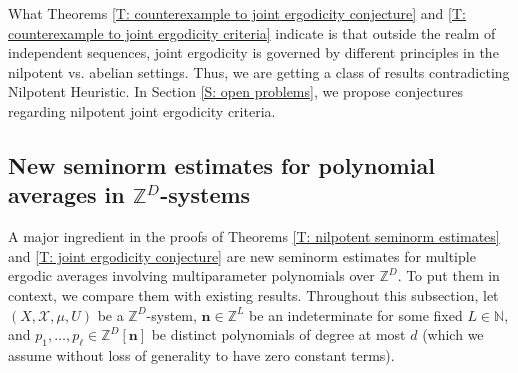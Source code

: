 \documentclass[11pt]{amsart}
\theoremstyle{definition}
\newcommand{\N}{{\mathbb N}}
\newcommand{\Z}{{\mathbb Z}}
\newcommand{\CX}{{\mathcal X}}
\newcommand{\bn}{{\mathbf{n}}}
\newcommand{\1}{{\mathbf{1}}}
\begin{document}
What Theorems \ref{T: counterexample to joint ergodicity conjecture} and \ref{T: counterexample to joint ergodicity criteria} indicate is that outside the realm of independent sequences, joint ergodicity is governed by different principles in the nilpotent vs. abelian settings. Thus, we are getting a class of results contradicting Nilpotent Heuristic. In Section \ref{S: open problems}, we propose conjectures regarding nilpotent joint ergodicity criteria.


\subsection{New seminorm estimates for polynomial averages in $\Z^D$-systems}
A major ingredient in the proofs of Theorems \ref{T: nilpotent seminorm estimates} and \ref{T: joint ergodicity conjecture} are new seminorm estimates for multiple ergodic averages involving {multiparameter} polynomials over $\Z^D$. 
To put them in context, we compare them with existing results. Throughout this subsection, let $(X, \CX, \mu, U)$ be a $\Z^D$-system, $\bn\in\Z^L$ be an indeterminate for some fixed $L\in\N$, and $p_1, \ldots, p_\ell\in \Z^D[\bn]$ be distinct polynomials of degree at most $d$ (which we assume without loss of generality to have zero constant terms).  
\end{document}
